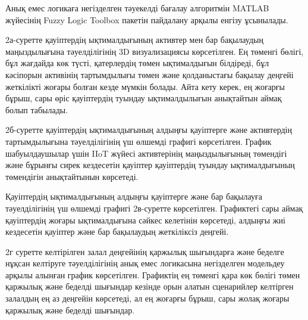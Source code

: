 \begin{multicols}{2}
Анық емес логикаға негізделген тәуекелді бағалау алгоритмін MATLAB
жүйесінің Fuzzy Logic Toolbox пакетін пайдалану арқылы енгізу ұсынылады.

2а-суретте қауіптердің ықтималдығының активтер мен бар бақылаудың
маңыздылығына тәуелділігінің 3D визуализациясы көрсетілген. Ең төменгі
бөлігі, бұл жағдайда көк түсті, қатерлердің төмен ықтималдығын
білдіреді, бұл кәсіпорын активінің тартымдылығы төмен және қолданыстағы
бақылау деңгейі жеткілікті жоғары болған кезде мүмкін болады. Айта кету
керек, ең жоғарғы бұрыш, сары өріс қауіптердің туындау ықтималдылығын
анықтайтын аймақ болып табылады.

2б-суретте қауіптердің ықтималдығының алдыңғы қауіптерге және
активтердің тартымдылығына тәуелділігінің үш өлшемді графигі
көрсетілген. График шабуылдаушылар үшін IIoT жүйесі активтерінің
маңыздылығының төмендігі және бұрынғы сирек кездесетін қауіптер
қауіптердің туындау ықтималдығының төмендігін анықтайтынын көрсетеді.

Қауіптердің ықтималдығының алдыңғы қауіптерге және бар бақылауға
тәуелділігінің үш өлшемді графигі 2в-суретте көрсетілген. Графиктегі
сары аймақ қауіптердің жоғары ықтималдығына сәйкес келетінін көрсетеді,
алдыңғы жиі кездесетін қауіптер және бар бақылаудың жеткіліксіз деңгейі.

2г суретте келтірілген залал деңгейінің қаржылық шығындарға және беделге
нұқсан келтіруге тәуелділігінің анық емес логикасына негізделген
модельдеу арқылы алынған график көрсетілген. Графиктің ең төменгі қара
көк бөлігі төмен қаржылық және беделді шығындар кезінде орын алатын
сценарийлер келтірген залалдың ең аз деңгейін көрсетеді, ал ең жоғарғы
бұрыш, сары жолақ жоғары қаржылық және беделді шығындар.
\end{multicols}

